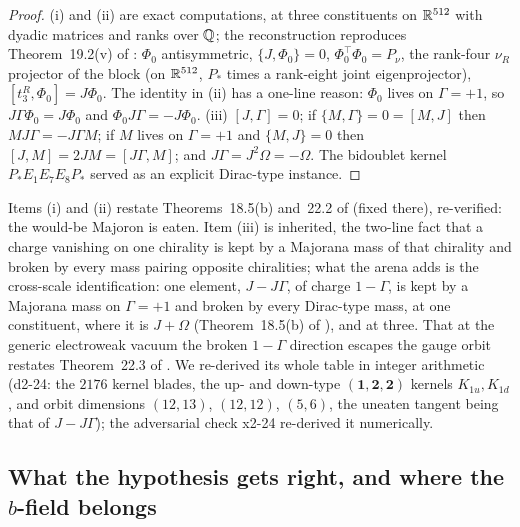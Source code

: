 \begin{proof}
(i) and (ii) are exact computations, at three constituents on $\mathbb{R}^{512}$ with dyadic matrices and ranks over $\mathbb{Q}$; the reconstruction reproduces
Theorem~19.2(v) of \cite{ES17}: $\Phi_0$ antisymmetric, $\{J,\Phi_0\}=0$, $\Phi_0^{\!\top}\Phi_0=P_\nu$, the rank-four $\nu_R$ projector of the block (on $\mathbb{R}^{512}$, $P_*$ times a rank-eight joint
eigenprojector),
$[t^R_3,\Phi_0]=J\Phi_0$. The identity in (ii) has a one-line reason: $\Phi_0$ lives on $\Gamma=+1$, so $J\Gamma\Phi_0=J\Phi_0$ and
$\Phi_0J\Gamma=-J\Phi_0$. (iii) $[J,\Gamma]=0$; if $\{M,\Gamma\}=0=[M,J]$ then $MJ\Gamma=-J\Gamma M$; if $M$ lives on $\Gamma=+1$ and $\{M,J\}=0$ then
$[J,M]=2JM=[J\Gamma,M]$; and $J\Gamma=J^2\Omega=-\Omega$. The bidoublet kernel $P_*E_1E_7E_8P_*$ served as an explicit Dirac-type instance.
\end{proof}

Items (i) and (ii) restate Theorems~18.5(b) and~22.2 of \cite{ES17} (fixed there), re-verified: the would-be Majoron is eaten. Item (iii) is inherited,
the two-line fact that a charge vanishing on one chirality is kept by a Majorana mass of that chirality and broken by every mass pairing opposite
chiralities; what the arena adds is the cross-scale identification: one element, $J-J\Gamma$, of charge $1-\Gamma$, is kept by a Majorana mass on
$\Gamma=+1$ and broken by every Dirac-type mass, at one constituent, where it is $J+\Omega$ (Theorem~18.5(b) of \cite{ES17}), and at three. That at
the generic electroweak vacuum the broken $1-\Gamma$ direction escapes the gauge orbit restates Theorem~22.3 of \cite{ES17}. We re-derived its whole
table in integer arithmetic (d2-24: the $2176$ kernel blades, the up- and down-type $(\mathbf1,\mathbf2,\mathbf2)$ kernels $K_{1u},K_{1d}$, and orbit
dimensions $(12,13)$, $(12,12)$, $(5,6)$, the uneaten tangent being that of $J-J\Gamma$); the adversarial check x2-24 re-derived it numerically.

\subsection{What the hypothesis gets right, and where the \texorpdfstring{$b$}{b}-field belongs}
\label{d2:sec:verdict}

